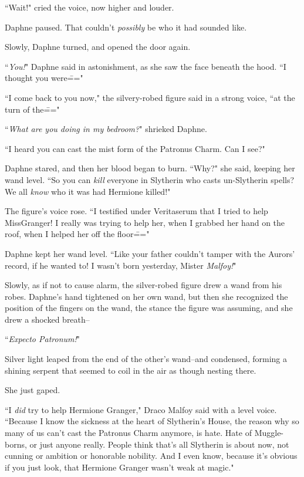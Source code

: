 ``Wait!" cried the voice, now higher and louder.

Daphne paused. That couldn't \emph{possibly} be who it had sounded like.

Slowly, Daphne turned, and opened the door again.

``\emph{You!}" Daphne said in astonishment, as she saw the face beneath the hood. ``I thought you were\==="

``I come back to you now," the silvery-robed figure said in a strong voice, ``at the turn of the\==="

``\emph{What are you doing in my bedroom?}" shrieked Daphne.

``I heard you can cast the mist form of the Patronus Charm. Can I see?"

Daphne stared, and then her blood began to burn. ``Why?" she said, keeping her wand level. ``So you can \emph{kill} everyone in Slytherin who casts un-Slytherin spells? We all \emph{know} who it was had Hermione killed!"

The figure's voice rose. ``I testified under Veritaserum that I tried to help Miss\?Granger! I really was trying to help her, when I grabbed her hand on the roof, when I helped her off the floor\==="

Daphne kept her wand level. ``Like your father couldn't tamper with the Aurors' record, if he wanted to! I wasn't born yesterday, Mister \emph{Malfoy!}"

Slowly, as if not to cause alarm, the silver-robed figure drew a wand from his robes. Daphne's hand tightened on her own wand, but then she recognized the position of the fingers on the wand, the stance the figure was assuming, and she drew a shocked breath\---

``\emph{Expecto Patronum!}"

Silver light leaped from the end of the other's wand\---and condensed, forming a shining serpent that seemed to coil in the air as though nesting there.

She just gaped.

``I \emph{did} try to help Hermione Granger," Draco Malfoy said with a level voice. ``Because I know the sickness at the heart of Slytherin's House, the reason why so many of us can't cast the Patronus Charm anymore, is hate. Hate of Muggle-borns, or just anyone really. People think that's all Slytherin is about now, not cunning or ambition or honorable nobility. And I even know, because it's obvious if you just look, that Hermione Granger wasn't weak at magic."

